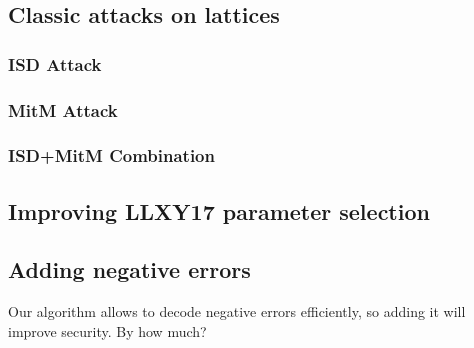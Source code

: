 \documentclass[12pt]{article}
\begin{document}
\subsection{Classic attacks on lattices}
\label{subsec:attacks}

\subsubsection{ISD Attack}
\label{subsec:isd_attack}

\subsubsection{MitM Attack}
\label{subsec:mitm_attack}

\subsubsection{ISD+MitM Combination}
\label{subsec:combination_attack}

\subsection{Improving LLXY17 parameter selection}
\label{subsec:param_improvement}

\subsection{Adding negative errors}
\label{subsec:negative_error_improvement}
Our algorithm allows to decode negative errors efficiently, so adding it will improve security. By how much?



\end{document}
